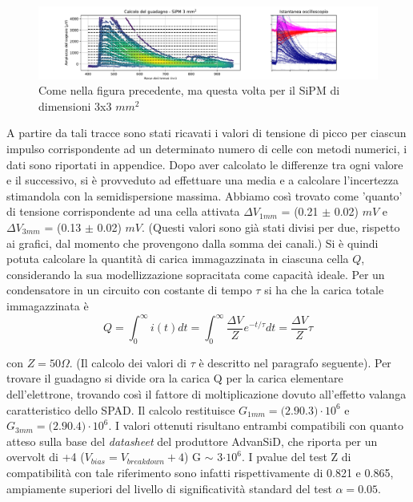 \documentclass[journal]{IEEEtran}
\begin{document}
\begin{figure}[t]%
\centering
\begin{center}
\includegraphics[trim = {100pt 0 0 0}, width=1.15\textwidth]{analysis/output/SiPM_3mm_gain_staircase.pdf}
\end{center}
\caption{Come nella figura precedente, ma questa volta per il SiPM di dimensioni 3x3 $mm^2$}
\label{fig:staircase_3mm}
\end{figure}

A partire da tali tracce sono stati ricavati i valori di tensione di picco per ciascun impulso corrispondente ad un determinato numero di celle con metodi numerici, i dati sono riportati in appendice. Dopo aver calcolato le differenze tra ogni valore e il successivo, si è provveduto ad effettuare una media e a calcolare l'incertezza stimandola con la semidispersione massima. Abbiamo così trovato come 'quanto' di tensione corrispondente ad una cella attivata $\Delta V_{1mm}$ = (0.21 $\pm$ 0.02) $mV$ e  $\Delta V_{3mm}$ = (0.13 $\pm$ 0.02) $mV$. (Questi valori sono già stati divisi per due, rispetto ai grafici, dal momento che provengono dalla somma dei canali.) Si è quindi potuta calcolare la quantità di carica immagazzinata in ciascuna cella $Q$, considerando la sua modellizzazione sopracitata come capacità ideale. Per un condensatore in un circuito con costante di tempo $\tau$ si ha che la carica totale immagazzinata è
\begin{equation}
    Q = \int_{0}^{\infty} i(t) dt = \int_{0}^{\infty} \frac{\Delta V}{Z} e^{-t/ \tau}  dt = \frac{\Delta V}{Z} \tau
\end{equation}

con $Z = 50 \Omega$. (Il calcolo dei valori di $\tau$ è descritto nel paragrafo seguente). Per trovare il guadagno si divide ora la carica Q per la carica elementare dell'elettrone, trovando così il fattore di moltiplicazione dovuto all'effetto valanga caratteristico dello SPAD. Il calcolo restituisce $G_{1mm} = (2.9 $\pm$ 0.3)\cdot 10^6$ e $G_{3mm} = (2.9 $\pm$ 0.4)\cdot 10^6$. I valori ottenuti risultano entrambi compatibili con quanto atteso sulla base del \textit{datasheet} del produttore AdvanSiD, che riporta per un overvolt di +4 ($V_{bias} = V_{breakdown} + 4$) G $\sim$ 3$\cdot10^6$. I pvalue del test Z di compatibilità con tale riferimento sono infatti rispettivamente di 0.821 e 0.865, ampiamente superiori del livello di significatività standard del test $\alpha = 0.05$.
\end{document}
